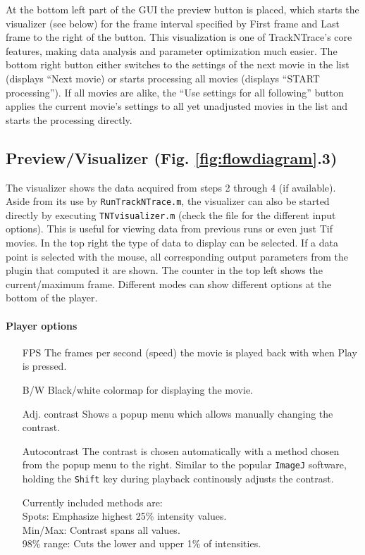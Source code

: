 \documentclass[11pt,onside]{report}
\numberwithin{equation}{chapter}
\begin{document}
At the bottom left part of the GUI the preview button is placed, which starts the visualizer (see below) for the frame interval specified by   \textsf{First frame} and \textsf{Last frame} to the right of the button. This visualization is one of TrackNTrace's core features, making data analysis and parameter optimization much easier. The bottom right button either switches to the settings of the next movie in the list (displays ``\textsf{Next movie}) or starts processing all movies (displays ``\textsf{START processing}''). If all movies are alike, the ``\textsf{Use settings for all following}'' button applies the current movie's settings to all yet unadjusted movies in the list and starts the processing directly.\\[10pt]

\subsection{Preview/Visualizer (Fig. \ref{fig:flowdiagram}.3)}
The visualizer shows the data acquired from steps 2 through 4 (if available). Aside from its use by \texttt{RunTrackNTrace.m}, the visualizer can also be started directly by executing \texttt{TNTvisualizer.m} (check the file for the different input options). This is useful for viewing data from previous runs or even just Tif movies. In the top right the type of data to display can be selected. If a data point is selected with the mouse, all corresponding output parameters from the plugin that computed it are shown. The counter in the top left shows the current/maximum frame. Different modes can show different options at the bottom of the player.

\paragraph{Player options}
\begin{itemize}[leftmargin=3cm]
\item[\textsf{FPS}] The frames per second (speed) the movie is played back with when \textsf{Play} is pressed.
\item[\textsf{B/W}] Black/white colormap for displaying the movie.
\item[\textsf{Adj. contrast}] Shows a popup menu which allows manually changing the contrast.
\item[\textsf{Autocontrast}] The contrast is chosen automatically with a method chosen from the popup menu to the right. Similar to the popular \texttt{ImageJ} software, holding the \texttt{Shift} key during playback continously adjusts the contrast.
\item[] Currently included methods are: \\\hspace*{0.35cm}Spots: Emphasize highest 25\% intensity values.\\\hspace*{0.35cm}Min/Max: Contrast spans all values.\\\hspace*{0.35cm}98\% range: Cuts the lower and upper 1\% of intensities. 
\end{itemize} 
\end{document}
